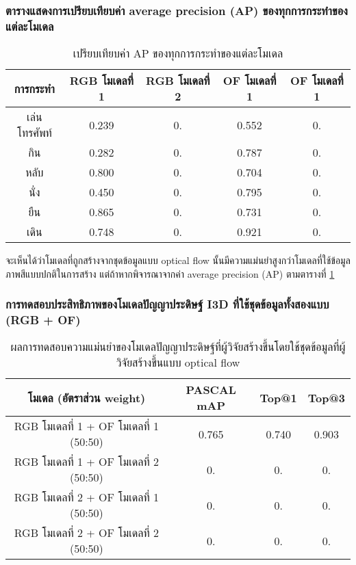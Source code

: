 \subsubsection{ตารางแสดงการเปรียบเทียบค่า average precision (AP) ของทุกการกระทำของแต่ละโมเดล}
\begin{table}[!ht]
	\centering
	\begin{tabular}{|c|c|c|c|c|}
			\hline
			{การกระทำ} & {RGB โมเดลที่ 1} & {RGB โมเดลที่ 2} & {OF โมเดลที่ 1} & {OF โมเดลที่ 1}\\
			\hline
			เล่นโทรศัพท์  & 0.239 & 0.	  & 0.552 & 0.	\\
			กิน			& 0.282	& 0.	& 0.787	& 0.	\\
			หลับ		& 0.800	& 0.	& 0.704	& 0.	\\
			นั่ง		 & 0.450 & 0.	 & 0.795 & 0.	\\
			ยืน			& 0.865	& 0.	& 0.731	& 0.	\\
			เดิน		& 0.748	& 0.	& 0.921	& 0.	\\
			\hline
	\end{tabular}
\caption{เปรียบเทียบค่า AP ของทุกการกระทำของแต่ละโมเดล}
\label{tab:I3D_RGB_OP_AP}
\end{table}
จะเห็นได้ว่าโมเดลที่ถูกสร้างจากชุดข้อมูลแบบ optical flow นั้นมีความแม่นยำสูงกว่าโมเดลที่ใช้ข้อมูลภาพสีแบบปกติในการสร้าง แต่ถ้าหากพิจารณาจากค่า average precision (AP) ตามตารางที่ \ref{tab:I3D_RGB_OP_AP}


\subsubsection{การทดสอบประสิทธิภาพของโมเดลปัญญาประดิษฐ์ I3D ที่ใช้ชุดข้อมูลทั้งสองแบบ (RGB + OF)}
\begin{table}[!ht]
	\centering
	\begin{tabular}{|c|c|c|c|}
			\hline
			{โมเดล (อัตราส่วน weight)}	&	{PASCAL mAP}	&	{Top@1}	&	{Top@3}\\
			\hline
			RGB โมเดลที่ 1 + OF โมเดลที่ 1 (50:50)	& 0.765	& 0.740	& 0.903	\\
			RGB โมเดลที่ 1 + OF โมเดลที่ 2 (50:50)	& 0.	& 0.	& 0.	\\
			RGB โมเดลที่ 2 + OF โมเดลที่ 1 (50:50)	& 0.	& 0.	& 0.	\\
			RGB โมเดลที่ 2 + OF โมเดลที่ 2 (50:50)	& 0.	& 0.	& 0.	\\
			\hline
	\end{tabular}
\caption{ผลการทดสอบความแม่นยำของโมเดลปัญญาประดิษฐ์ที่ผู้วิจัยสร้างขึ้นโดยใช้ชุดข้อมูลที่ผู้วิจัยสร้างขึ้นแบบ optical flow}
\label{tab:I3D_OP_performance}
\end{table}
